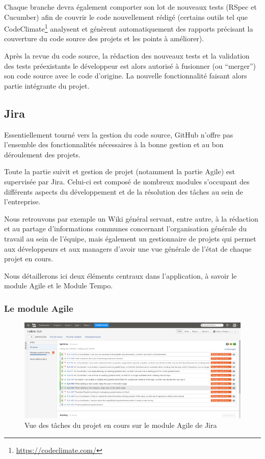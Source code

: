 \documentclass[12pt,a4paper]{book}
\begin{document}
Chaque branche devra également comporter son lot de nouveaux tests (RSpec et Cucumber) afin de couvrir le code nouvellement rédigé (certains outils tel que CodeClimate\footnote{\url{https://codeclimate.com/}} analysent et génèrent automatiquement des rapports précisant la couverture du code source des projets et les points à améliorer).

Après la revue du code source, la rédaction des nouveaux tests et la validation des tests préexistants le développeur est alors autorisé à fusionner (ou ``merger'') son code source avec le code d'origine. La nouvelle fonctionnalité faisant alors partie intégrante du projet.

\subsection{Jira}

\label{sec.jira}

Essentiellement tourné vers la gestion du code source, GitHub n'offre pas l'ensemble des fonctionnalités nécessaires à la bonne gestion et au bon déroulement des projets.

Toute la partie suivit et gestion de projet (notamment la partie Agile) est supervisée par Jira. Celui-ci est composé de nombreux modules s'occupant des différents aspects du développement et de la résolution des tâches au sein de l'entreprise.

Nous retrouvons par exemple un Wiki général servant, entre autre, à la rédaction et au partage d'informations communes concernant l'organisation générale du travail au sein de l'équipe, mais également un gestionnaire de projets qui permet aux développeurs et aux managers d'avoir une vue générale de l'état de chaque projet en cours.

Nous détaillerons ici deux éléments centraux dans l'application, à savoir le module Agile et le Module Tempo.

\subsubsection{Le module Agile}

\begin{figure}[htp]
\centering
\includegraphics[scale=.30]{img/jira_agile_1.png}
 \caption{Vue des tâches du projet en cours sur le module Agile de Jira}
 \label{fig.jira_agile1}
\end{figure}
\end{document}
